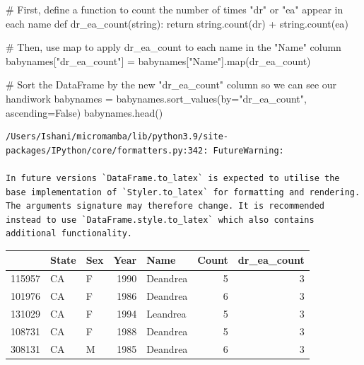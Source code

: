 \documentclass[
  letterpaper,
  DIV=11,
  numbers=noendperiod]{scrreprt}
\newenvironment{Shaded}{\begin{snugshade}}{\end{snugshade}}
\newcommand{\BuiltInTok}[1]{\textcolor[rgb]{0.00,0.23,0.31}{#1}}
\newcommand{\CommentTok}[1]{\textcolor[rgb]{0.37,0.37,0.37}{#1}}
\newcommand{\ControlFlowTok}[1]{\textcolor[rgb]{0.00,0.23,0.31}{#1}}
\newcommand{\KeywordTok}[1]{\textcolor[rgb]{0.00,0.23,0.31}{#1}}
\newcommand{\NormalTok}[1]{\textcolor[rgb]{0.00,0.23,0.31}{#1}}
\newcommand{\OperatorTok}[1]{\textcolor[rgb]{0.37,0.37,0.37}{#1}}
\newcommand{\StringTok}[1]{\textcolor[rgb]{0.13,0.47,0.30}{#1}}
\newcommand{\VariableTok}[1]{\textcolor[rgb]{0.07,0.07,0.07}{#1}}
\begin{document}
\begin{Shaded}
\begin{Highlighting}[]
\CommentTok{\# First, define a function to count the number of times "dr" or "ea" appear in each name}
\KeywordTok{def}\NormalTok{ dr\_ea\_count(string):}
    \ControlFlowTok{return}\NormalTok{ string.count(}\StringTok{\textquotesingle{}dr\textquotesingle{}}\NormalTok{) }\OperatorTok{+}\NormalTok{ string.count(}\StringTok{\textquotesingle{}ea\textquotesingle{}}\NormalTok{)}

\CommentTok{\# Then, use \textasciigrave{}map\textasciigrave{} to apply \textasciigrave{}dr\_ea\_count\textasciigrave{} to each name in the "Name" column}
\NormalTok{babynames[}\StringTok{"dr\_ea\_count"}\NormalTok{] }\OperatorTok{=}\NormalTok{ babynames[}\StringTok{"Name"}\NormalTok{].}\BuiltInTok{map}\NormalTok{(dr\_ea\_count)}

\CommentTok{\# Sort the DataFrame by the new "dr\_ea\_count" column so we can see our handiwork}
\NormalTok{babynames }\OperatorTok{=}\NormalTok{ babynames.sort\_values(by}\OperatorTok{=}\StringTok{"dr\_ea\_count"}\NormalTok{, ascending}\OperatorTok{=}\VariableTok{False}\NormalTok{)}
\NormalTok{babynames.head()}
\end{Highlighting}
\end{Shaded}

\begin{verbatim}
/Users/Ishani/micromamba/lib/python3.9/site-packages/IPython/core/formatters.py:342: FutureWarning:

In future versions `DataFrame.to_latex` is expected to utilise the base implementation of `Styler.to_latex` for formatting and rendering. The arguments signature may therefore change. It is recommended instead to use `DataFrame.style.to_latex` which also contains additional functionality.
\end{verbatim}

\begin{tabular}{lllrlrr}
\toprule
{} & State & Sex &  Year &      Name &  Count &  dr\_ea\_count \\
\midrule
115957 &    CA &   F &  1990 &  Deandrea &      5 &            3 \\
101976 &    CA &   F &  1986 &  Deandrea &      6 &            3 \\
131029 &    CA &   F &  1994 &  Leandrea &      5 &            3 \\
108731 &    CA &   F &  1988 &  Deandrea &      5 &            3 \\
308131 &    CA &   M &  1985 &  Deandrea &      6 &            3 \\
\bottomrule
\end{tabular}
\end{document}
